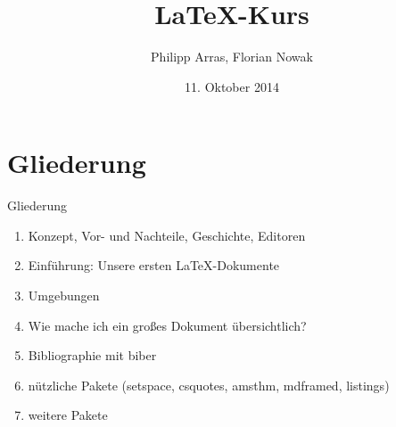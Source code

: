 \documentclass[11pt]{beamer}
\author{Philipp Arras, Florian Nowak}
\title{\LaTeX -Kurs}
\date{11. Oktober 2014}
\begin{document}
\begin{frame}
\titlepage
\end{frame}


\section{Gliederung}
\begin{frame}{Gliederung}
\begin{enumerate}
\item Konzept, Vor- und Nachteile, Geschichte, Editoren
\item Einführung: Unsere ersten LaTeX-Dokumente
\item Umgebungen
\item Wie mache ich ein großes Dokument übersichtlich?
\item Bibliographie mit biber
\item nützliche Pakete (setspace, csquotes, amsthm, mdframed, listings)
\item weitere Pakete
\end{enumerate}

\end{frame}
\end{document}
